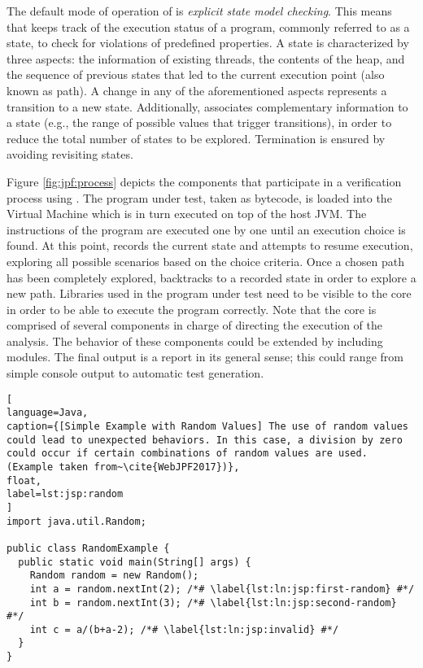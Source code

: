 The default mode of operation of \jpf{} is \textit{explicit state model checking}. This means that \jpf{} keeps track of the execution status of a program, commonly referred to as a state, to check for violations of predefined properties. A state is characterized by three aspects: the information of existing threads, the contents of the heap, and the sequence of previous states that led to the current execution point (also known as path). A change in any of the aforementioned aspects represents a transition to a new state. Additionally, \jpf{} associates complementary information to a state (e.g., the range of possible values that trigger transitions), in order to reduce the total number of states to be explored. Termination is ensured by avoiding revisiting states.

Figure \ref{fig:jpf:process} depicts the components that participate in a verification process using \jpf{}. The program under test, taken as bytecode, is loaded into the \jpf{} Virtual Machine which is in turn executed on top of the host JVM. The instructions of the program are executed one by one until an execution choice is found. At this point, \jpf{} records the current state and attempts to resume execution, exploring all possible scenarios based on the choice criteria. Once a chosen path has been completely explored, \jpf{} backtracks to a recorded state in order to explore a new path. Libraries used in the program under test need to be visible to the core in order to be able to execute the program correctly. Note that the core is comprised of several components in charge of directing the execution of the analysis. The behavior of these components could be extended by including modules. The final output is a report in its general sense; this could range from simple console output to automatic test generation.

\begin{lstlisting}[
language=Java,
caption={[Simple Example with Random Values] The use of random values could lead to unexpected behaviors. In this case, a division by zero could occur if certain combinations of random values are used. (Example taken from~\cite{WebJPF2017})},
float,
label=lst:jsp:random
]
import java.util.Random;

public class RandomExample {
  public static void main(String[] args) {
    Random random = new Random();
    int a = random.nextInt(2); /*# \label{lst:ln:jsp:first-random} #*/
    int b = random.nextInt(3); /*# \label{lst:ln:jsp:second-random} #*/
    int c = a/(b+a-2); /*# \label{lst:ln:jsp:invalid} #*/
  }
}
\end{lstlisting}

